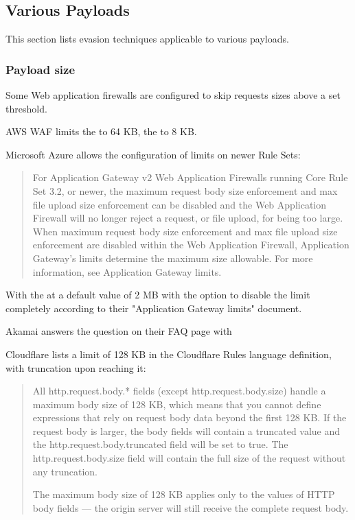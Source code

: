 \subsection{Various Payloads}
\label{sec:varioustech}
This section lists evasion techniques applicable to various payloads.

\subsubsection{Payload size}
Some Web application firewalls are configured to skip requests sizes above a set threshold.

AWS WAF limits the  to 64 KB, the  to 8 KB. \cite{aws/waflimits}

Microsoft Azure allows the configuration of limits on newer Rule Sets:
\begin{quote}
	For Application Gateway v2 Web Application Firewalls running Core Rule Set 3.2, or newer, the maximum request body size enforcement and max file upload size enforcement can be disabled and the Web Application Firewall will no longer reject a request, or file upload, for being too large. When maximum request body size enforcement and max file upload size enforcement are disabled within the Web Application Firewall, Application Gateway's limits determine the maximum size allowable. For more information, see Application Gateway limits. \cite{ms/azurewaflimits}
\end{quote}

With the  at a default value of 2 MB with the option to disable the limit completely according to their "Application Gateway limits" document. \cite{ms/appgatewaylimits}

Akamai answers the question  on their FAQ page with  \cite{akamai/waflimits}

Cloudflare lists a limit of 128 KB in the Cloudflare Rules language definition, with truncation upon reaching it:
\begin{quote}
	All http.request.body.* fields (except http.request.body.size) handle a maximum body size of 128 KB, which means that you cannot define expressions that rely on request body data beyond the first 128 KB. If the request body is larger, the body fields will contain a truncated value and the http.request.body.truncated field will be set to true. The http.request.body.size field will contain the full size of the request without any truncation.

	The maximum body size of 128 KB applies only to the values of HTTP body fields — the origin server will still receive the complete request body.
\end{quote}

